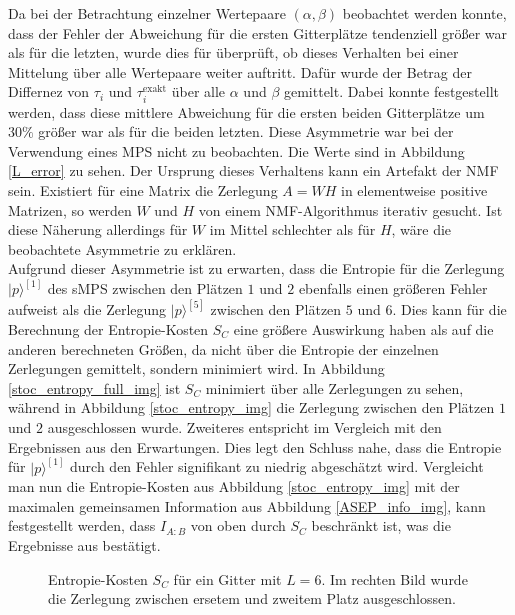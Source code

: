 \documentclass[10pt,a4paper]{report}
\begin{document}
Da bei der Betrachtung einzelner Wertepaare $(\alpha,\beta)$ beobachtet werden konnte, dass der Fehler der Abweichung für die ersten Gitterplätze tendenziell größer war als für die letzten, wurde dies für überprüft, ob dieses Verhalten bei einer Mittelung über alle Wertepaare weiter auftritt. Dafür wurde der Betrag der Differnez von $\tau_i$ und $\tau_i^{\text{exakt}}$ über alle $\alpha$ und $\beta$ gemittelt. Dabei konnte festgestellt werden, dass diese mittlere Abweichung für die ersten beiden Gitterplätze um $30\%$ größer war als für die beiden letzten. Diese Asymmetrie war bei der Verwendung eines MPS nicht zu beobachten. Die Werte sind in Abbildung \ref{L_error} zu sehen. Der Ursprung dieses Verhaltens kann ein Artefakt der NMF sein. Existiert für eine Matrix die Zerlegung $A=WH$ in elementweise positive Matrizen, so werden $W$ und $H$ von einem NMF-Algorithmus iterativ gesucht.\cite{MPS-vs-sMPS} Ist diese Näherung allerdings für  $W$ im Mittel schlechter als für $H$, wäre die beobachtete Asymmetrie zu erklären.\\


Aufgrund dieser Asymmetrie ist zu erwarten, dass die Entropie für die Zerlegung $|p\rangle^{[1]}$ des sMPS zwischen den Plätzen $1$ und $2$ ebenfalls einen größeren Fehler aufweist als die Zerlegung $|p\rangle^{[5]}$ zwischen den Plätzen $5$ und $6$. Dies kann für die Berechnung der Entropie-Kosten $S_C$ eine größere Auswirkung haben als auf die anderen berechneten Größen, da nicht über die Entropie der einzelnen Zerlegungen gemittelt, sondern minimiert wird. In Abbildung \ref{stoc_entropy_full_img} ist $S_C$ minimiert über alle Zerlegungen zu sehen, während in Abbildung \ref{stoc_entropy_img} die Zerlegung zwischen den Plätzen $1$ und $2$ ausgeschlossen wurde. Zweiteres entspricht im Vergleich mit den Ergebnissen aus \cite{sMPS} den Erwartungen. Dies legt den Schluss nahe, dass die Entropie für $|p\rangle^{[1]}$ durch den Fehler signifikant zu niedrig abgeschätzt wird. Vergleicht man nun die Entropie-Kosten aus Abbildung \ref{stoc_entropy_img} mit der maximalen gemeinsamen Information aus Abbildung \ref{ASEP_info_img}, kann festgestellt werden, dass $I_{A:B}$ von oben durch $S_C$ beschränkt ist, was die Ergebnisse aus \cite{sMPS} bestätigt.\\

\begin{figure}
\centering
{}
\caption{Entropie-Kosten $S_C$ für ein Gitter mit $L=6$. Im rechten Bild wurde die Zerlegung zwischen ersetem und zweitem Platz ausgeschlossen.}
\end{figure}
\end{document}
